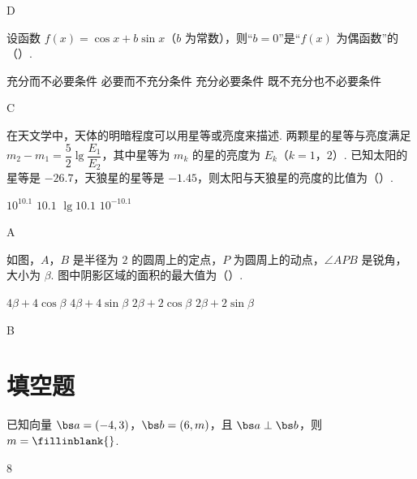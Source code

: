 \begin{answer}
D
\end{answer}

\begin{problem}
设函数 \(f(x)=\cos x+b\sin x\)（\(b\) 为常数），则“\(b=0\)”是“\(f(x)\) 为偶函数”的（\quad）.

\choices
    {充分而不必要条件}
    {必要而不充分条件}
    {充分必要条件}
    {既不充分也不必要条件}
\end{problem}

\begin{answer}
C
\end{answer}

\begin{problem}
在天文学中，天体的明暗程度可以用星等或亮度来描述. 两颗星的星等与亮度满足 \(m_2-m_1=\dfrac52\lg\dfrac{E_1}{E_2}\)，其中星等为 \(m_k\) 的星的亮度为 \(E_k\)（\(k=1\)，\(2\)）. 已知太阳的星等是 \(-26.7\)，天狼星的星等是 \(-1.45\)，则太阳与天狼星的亮度的比值为（\quad）.

\choices
    {\(10^{10.1}\)}
    {\(10.1\)}
    {\(\lg 10.1\)}
    {\(10^{-10.1}\)}
\end{problem}

\begin{answer}
A
\end{answer}

\begin{problem}
如图，\(A\)，\(B\) 是半径为 \(2\) 的圆周上的定点，\(P\) 为圆周上的动点，\(\angle APB\) 是锐角，大小为 \(\beta\). 图中阴影区域的面积的最大值为（\quad）.


\choices
    {\(4\beta+4\cos\beta\)}
    {\(4\beta+4\sin\beta\)}
    {\(2\beta+2\cos\beta\)}
    {\(2\beta+2\sin\beta\)}
\end{problem}

\begin{answer}
B
\end{answer}

\section{填空题}

\begin{problem}
已知向量 \(\bs a=(-4,3)\)，\(\bs b=(6,m)\)，且 \(\bs a\perp\bs b\)，则 \(m=\fillinblank{}\).
\end{problem}

\begin{answer}
\(8\)
\end{answer}

